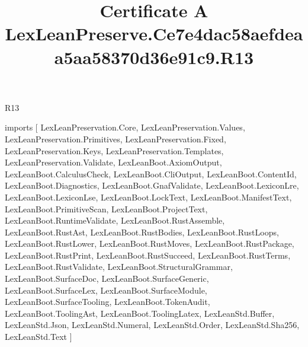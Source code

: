 \begin{lexlean}{R13}
\title{Certificate A LexLeanPreserve.Ce7e4dac58aefdeaa5aa58370d36e91c9.R13}
\begin{coremodule}
imports [
  LexLeanPreservation.Core,
  LexLeanPreservation.Values,
  LexLeanPreservation.Primitives,
  LexLeanPreservation.Fixed,
  LexLeanPreservation.Keys,
  LexLeanPreservation.Templates,
  LexLeanPreservation.Validate,
  LexLeanBoot.AxiomOutput,
  LexLeanBoot.CalculusCheck,
  LexLeanBoot.CliOutput,
  LexLeanBoot.ContentId,
  LexLeanBoot.Diagnostics,
  LexLeanBoot.GnafValidate,
  LexLeanBoot.LexiconLre,
  LexLeanBoot.LexiconLse,
  LexLeanBoot.LockText,
  LexLeanBoot.ManifestText,
  LexLeanBoot.PrimitiveScan,
  LexLeanBoot.ProjectText,
  LexLeanBoot.RuntimeValidate,
  LexLeanBoot.RustAssemble,
  LexLeanBoot.RustAst,
  LexLeanBoot.RustBodies,
  LexLeanBoot.RustLoops,
  LexLeanBoot.RustLower,
  LexLeanBoot.RustMoves,
  LexLeanBoot.RustPackage,
  LexLeanBoot.RustPrint,
  LexLeanBoot.RustSucceed,
  LexLeanBoot.RustTerms,
  LexLeanBoot.RustValidate,
  LexLeanBoot.StructuralGrammar,
  LexLeanBoot.SurfaceDoc,
  LexLeanBoot.SurfaceGeneric,
  LexLeanBoot.SurfaceLex,
  LexLeanBoot.SurfaceModule,
  LexLeanBoot.SurfaceTooling,
  LexLeanBoot.TokenAudit,
  LexLeanBoot.ToolingAst,
  LexLeanBoot.ToolingLatex,
  LexLeanStd.Buffer,
  LexLeanStd.Json,
  LexLeanStd.Numeral,
  LexLeanStd.Order,
  LexLeanStd.Sha256,
  LexLeanStd.Text
]


\end{coremodule}
\end{lexlean}
